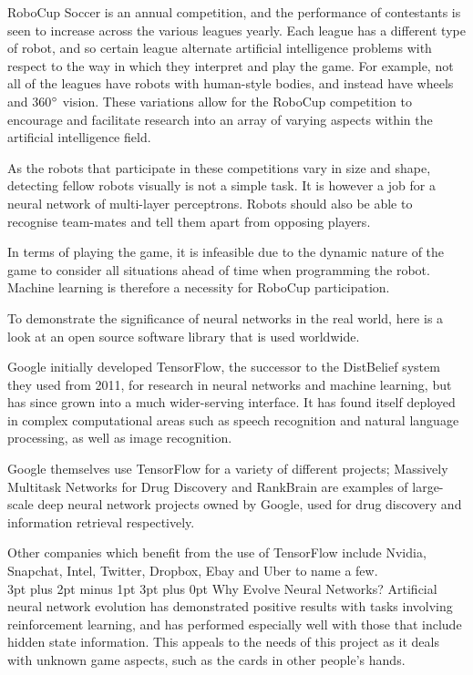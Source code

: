 \documentclass[12pt,a4paper]{article}
\makeatletter
\renewcommand\subsection{\@startsection {subsection}{1}{2mm} %
                               {3pt plus 2pt minus 1pt} %
                               {3pt plus 0pt} %
                               {\normalfont\bfseries}}
\makeatother
\begin{document}
RoboCup Soccer is an annual competition, and the performance of contestants is seen to increase across the various leagues yearly\citep{30}. Each league has a different type of robot, and so certain league alternate artificial intelligence problems with respect to the way in which they interpret and play the game. For example, not all of the leagues have robots with human-style bodies, and instead have wheels and 360$\degree$ vision. These variations allow for the RoboCup competition to encourage and facilitate research into an array of varying aspects within the artificial intelligence field. 

As the robots that participate in these competitions vary in size and shape, detecting fellow robots visually is not a simple task. It is however a job for a neural network of multi-layer perceptrons\citep{24}. Robots should also be able to recognise team-mates and tell them apart from opposing players. 

In terms of playing the game, it is infeasible due to the dynamic nature of the game to consider all situations ahead of time when programming the robot\citep{25}. Machine learning is therefore a necessity for RoboCup participation.

To demonstrate the significance of neural networks in the real world, here is a look at an open source software library that is used worldwide. 

Google initially developed TensorFlow, the successor to the DistBelief system they used from 2011\citep{19}, for research in neural networks and machine learning\citep{17}, but has since grown into a much wider-serving interface. It has found itself deployed in complex computational areas such as speech recognition and natural language processing, as well as image recognition\citep{18}. 

Google themselves use TensorFlow for a variety of different projects;  Massively Multitask Networks for Drug Discovery and RankBrain are examples of large-scale deep neural network projects owned by Google, used for drug discovery and information retrieval respectively\citep{17}. 

Other companies which benefit from the use of TensorFlow include Nvidia, Snapchat, Intel, Twitter, Dropbox, Ebay and Uber to name a few. \\


\subsection{Why Evolve Neural Networks?}
Artificial neural network evolution has demonstrated positive results with tasks involving reinforcement learning, and has performed especially well with those that include hidden state information\citep{EfficientEvolutionOfNeuralNetworkTopologies}. This appeals to the needs of this project as it deals with unknown game aspects, such as the cards in other people's hands. 
\end{document}

